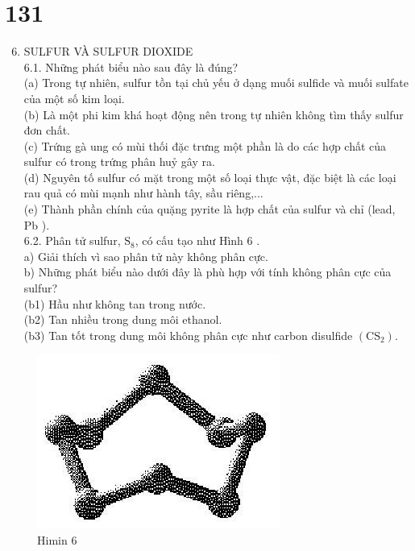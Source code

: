 \documentclass[10pt]{article}
\begin{document}
\section*{131}
\begin{enumerate}
  \setcounter{enumi}{5}
  \item SULFUR VÀ SULFUR DIOXIDE\\
6.1. Những phát biểu nào sau đây là đúng?\\
(a) Trong tự nhiên, sulfur tồn tại chủ yếu ở dạng muối sulfide và muối sulfate của một số kim loại.\\
(b) Là một phi kim khá hoạt động nên trong tự nhiên không tìm thấy sulfur đơn chất.\\
(c) Trứng gà ung có mùi thối đặc trưng một phần là do các hợp chất của sulfur có trong trứng phân huỷ gây ra.\\
(d) Nguyên tố sulfur có mặt trong một số loại thực vật, đặc biệt là các loại rau quả có mùi mạnh như hành tây, sầu riêng,...\\
(e) Thành phần chính của quặng pyrite là hợp chất của sulfur và chỉ (lead, Pb ).\\
6.2. Phân tử sulfur, $\mathrm{S}_{8}$, có cấu tạo như Hình 6 .\\
a) Giải thích vì sao phân tử này không phân cực.\\
b) Những phát biểu nào dưới đây là phù hợp với tính không phân cực của sulfur?\\
(b1) Hầu như không tan trong nước.\\
(b2) Tan nhiều trong dung môi ethanol.\\
(b3) Tan tốt trong dung môi không phân cực như carbon disulfide $\left(\mathrm{CS}_{2}\right)$.
\end{enumerate}

\begin{figure}[h]
\begin{center}
  \includegraphics[width=\textwidth]{2025_10_23_f2823ef970776205e47bg-18}
\captionsetup{labelformat=empty}
\caption{Himin 6}
\end{center}
\end{figure}
\end{document}
